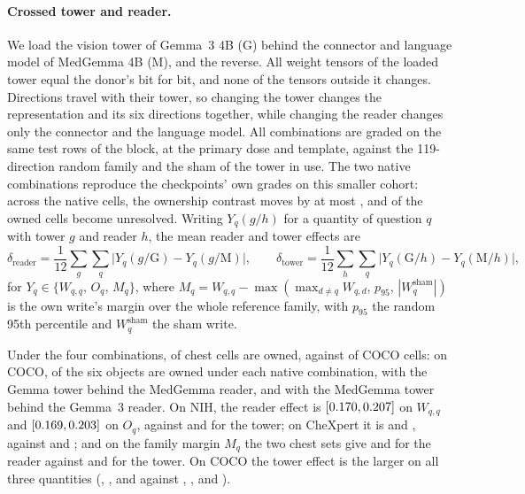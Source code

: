 \documentclass{article}
\begin{document}
\paragraph{Crossed tower and reader.} We load the vision tower of Gemma~3 4B (G) behind the connector and language model of MedGemma 4B (M), and the reverse. All \cfSwapTensors{} weight tensors of the loaded tower equal the donor's bit for bit, and none of the \cfSwapOutside{} tensors outside it changes. Directions travel with their tower, so changing the tower changes the representation and its six directions together, while changing the reader changes only the connector and the language model. All \cfSwapCombos{} combinations are graded on the same \cfSwapRows{} test rows of the block, at the primary dose and template, against the 119-direction random family and the sham of the tower in use. The two native combinations reproduce the checkpoints' own grades on this smaller cohort: across the \cfSwapNativeCells{} native cells, the ownership contrast moves by at most \cfSwapNativeMaxDO{}, and \cfSwapNativeUnresolved{} of the \cfSwapNativeOwnedFull{} owned cells become unresolved. Writing $Y_q(g/h)$ for a quantity of question $q$ with tower $g$ and reader $h$, the mean reader and tower effects are
\begin{equation}
\delta_{\text{reader}}=\frac{1}{12}\sum_{g}\sum_{q}\bigl|Y_q(g/\mathrm G)-Y_q(g/\mathrm M)\bigr|,\qquad
\delta_{\text{tower}}=\frac{1}{12}\sum_{h}\sum_{q}\bigl|Y_q(\mathrm G/h)-Y_q(\mathrm M/h)\bigr|,
\label{eq:crossover}
\end{equation}
for $Y_q\in\{W_{q,q},\,O_q,\,M_q\}$, where $M_q=W_{q,q}-\max(\max_{d\neq q}W_{q,d},\,p_{95},\,|W^{\mathrm{sham}}_q|)$ is the own write's margin over the whole reference family, with $p_{95}$ the random 95th percentile and $W^{\mathrm{sham}}_q$ the sham write.

Under the four combinations, \cfSwapChestOwned{} of \cfSwapChestCells{} chest cells are owned, against \cfSwapCocoOwned{} of \cfSwapCocoCells{} COCO cells: on COCO, \cfSwapCocoNativeMin{} of the six objects are owned under each native combination, \cfSwapCocoGemmaTowerCross{} with the Gemma tower behind the MedGemma reader, and \cfSwapCocoMedTowerCross{} with the MedGemma tower behind the Gemma~3 reader. On NIH, the reader effect is \cfSwapReaderNihMin{} $[0.170,0.207]$ on $W_{q,q}$ and \cfSwapReaderNihOMin{} $[0.169,0.203]$ on $O_q$, against \cfSwapTowerNihMin{} and \cfSwapTowerNihOMin{} for the tower; on CheXpert it is \cfSwapReaderChexMin{} and \cfSwapReaderChexOMin{}, against \cfSwapTowerChexMin{} and \cfSwapTowerChexOMin{}; and on the family margin $M_q$ the two chest sets give \cfSwapReaderNihMMin{} and \cfSwapReaderChexMMin{} for the reader against \cfSwapTowerNihMMin{} and \cfSwapTowerChexMMin{} for the tower. On COCO the tower effect is the larger on all three quantities (\cfSwapTowerCocoMin{}, \cfSwapTowerCocoOMin{}, and \cfSwapTowerCocoMMin{} against \cfSwapReaderCocoMin{}, \cfSwapReaderCocoOMin{}, and \cfSwapReaderCocoMMin{}).
\end{document}
